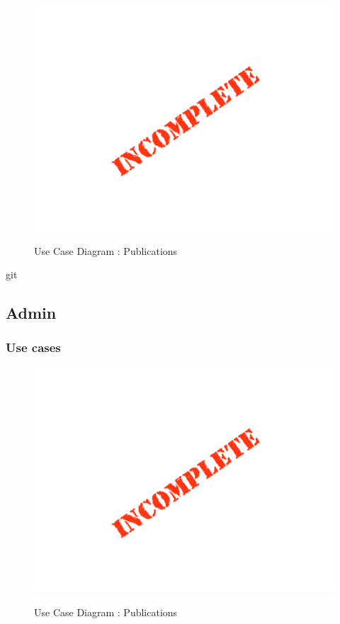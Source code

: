 \documentclass{article}
\begin{document}
		\begin{figure}[H]
		\includegraphics[width=\textwidth]{images/Incomplete.png}  \\
		\caption{Use Case Diagram : Publications}
		\end{figure}git 


	\subsection{Admin}

	\subsubsection{Use cases}

	\begin{figure}[H]
	\includegraphics[width=\textwidth]{images/Incomplete.png}  \\
	\caption{Use Case Diagram : Publications}
	\end{figure}
\end{document}
